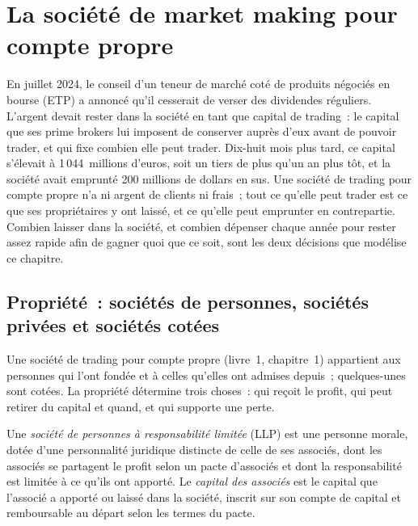 \chapter{La société de market making pour compte propre}\label{ch:fm:the-proprietary-market-making-firm}

En juillet 2024, le conseil d'un teneur de marché coté de produits négociés en bourse (ETP) a annoncé qu'il cesserait de verser des dividendes réguliers. L'argent devait
rester dans la société en tant que capital de trading~: le capital que ses prime brokers lui imposent de conserver auprès d'eux avant de pouvoir trader, et qui fixe combien elle
peut trader. Dix-huit mois plus tard, ce capital s'élevait à 1\,044~millions d'euros, soit un tiers de plus qu'un an plus tôt, et la société avait emprunté 200
millions de dollars en sus. Une société de trading pour compte propre n'a ni argent de clients ni frais~; tout ce qu'elle peut trader est ce que ses propriétaires y ont laissé, et
ce qu'elle peut emprunter en contrepartie. Combien laisser dans la société, et combien dépenser chaque année pour rester assez rapide afin de gagner quoi que ce soit, sont les deux décisions
que modélise ce chapitre.

\section{Propriété~: sociétés de personnes, sociétés privées et sociétés cotées}

Une société de trading pour compte propre (livre~1, chapitre~1) appartient aux personnes qui l'ont fondée et à celles qu'elles ont admises depuis~; quelques-unes sont
cotées. La propriété détermine trois choses~: qui reçoit le profit, qui peut retirer du capital et quand, et qui supporte une perte.

\begin{definition}\label{def:fm:the-proprietary-market-making-firm:llp}
Une \emph{société de personnes à responsabilité limitée} (LLP) est une personne morale, dotée d'une personnalité juridique distincte de celle de ses associés,
dont les associés se partagent le profit selon un pacte d'associés et dont la responsabilité est limitée à ce qu'ils ont apporté. Le
\emph{capital des associés} est le capital que l'associé a apporté ou laissé dans la société, inscrit sur son compte de capital
et remboursable au départ selon les termes du pacte.
\end{definition}

